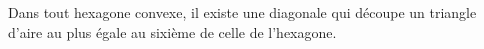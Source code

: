 Dans tout hexagone convexe, il existe une diagonale qui découpe un triangle d'aire au plus égale au sixième de celle de l'hexagone.
